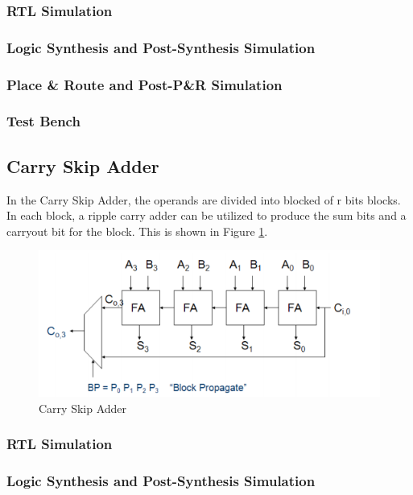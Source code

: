 \documentclass[12pt]{article}
\begin{document}
\subsubsection{RTL Simulation}

\subsubsection{Logic Synthesis and Post-Synthesis Simulation}

\subsubsection{Place \& Route and Post-P\&R Simulation}

\subsubsection{Test Bench}

\subsection{Carry Skip Adder}
In the Carry Skip Adder, the operands are divided into blocked of r bits blocks. In each block, a ripple carry adder can be utilized to produce the sum bits and a carryout bit for the block. This is shown in Figure \ref{fig:carry-skip}.

\begin{figure}[H]
\centering
\includegraphics[width=0.7\linewidth]{carry-skip}
\caption{Carry Skip Adder}
\label{fig:carry-skip}
\end{figure}

\subsubsection{RTL Simulation}

\subsubsection{Logic Synthesis and Post-Synthesis Simulation}
\end{document}

